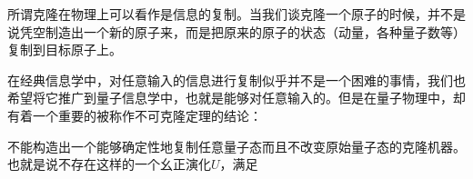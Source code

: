
所谓克隆在物理上可以看作是信息的复制。当我们谈克隆一个原子的时候，并不是说凭空制造出一个新的原子来，而是把原来的原子的状态（动量，各种量子数等）复制到目标原子上。

在经典信息学中，对任意输入的信息进行复制似乎并不是一个困难的事情，我们也希望将它推广到量子信息学中，也就是能够对任意输入的。但是在量子物理中，却有着一个重要的被称作不可克隆定理的结论：
\begin{theorem}{}
不能构造出一个能够确定性地复制任意量子态而且不改变原始量子态的克隆机器。也就是说不存在这样的一个幺正演化$U$，满足
\end{theorem}